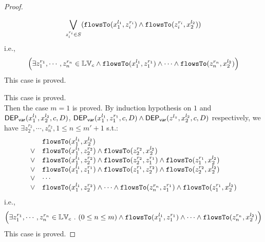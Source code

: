 {\begin{proof}
\begin{subproof}
\begin{enumerate}
\[
\bigvee_{z_i^{r_i} \in S} 
(\mathtt{flowsTo}(x_1^{l_1}, z_i^{r_i}) \land \mathtt{flowsTo}(z_i^{r_i}, x_2^{l_2}))
\]
%
i.e.,
\[
\Big(\exists z_1^{r_1}, \cdots, z_n^{r_n} \in \mathbb{LV}_{{c}}
 \land \mathtt{flowsTo}(x_1^{l_1}, z_1^{r_1}) \land \cdots \land \mathtt{flowsTo}(z_n^{r_n}, {x}_2^{l_2}) \Big)
\]
%
This case is proved.
\end{enumerate}
\end{subproof}
%
This case is proved.
%
\\
Then the case $m = 1$ is proved.
%
By induction hypothesis on $1$ and $\mathsf{DEP_{var}}(x_1^{l_1}, x_2^{l_2}, c, D)$, 
$\mathsf{DEP_{var}}(x_1^{l_1}, z_1^{r_1}, c, D) \land \mathsf{DEP_{var}}(z^{l_z}, x_2^{l_2}, c, D)$ respectively, 
we have $\exists z_2^{r_2}, \cdots, z_n^{r_2}, 1 \leq n \leq m'+1$ s.t.:
\[
\begin{array}{ll}
      & \mathtt{flowsTo}(x_1^{l_1}, x_2^{l_2}) \\
  \lor  & \mathtt{flowsTo}(x_1^{l_1}, z_2^{r_2}) \land \mathtt{flowsTo}(z_2^{r_2}, x_2^{l_2})\\
  \lor  & \mathtt{flowsTo}(x_1^{l_1}, z_2^{r_2}) \land \mathtt{flowsTo}(z_2^{r_2}, z_1^{r_1}) \land \mathtt{flowsTo}(z_1^{r_1}, x_2^{l_2}) \\
  \lor  & \mathtt{flowsTo}(x_1^{l_1}, z_1^{r_1}) \land \mathtt{flowsTo}(z_1^{r_1}, z_2^{r_2}) \land \mathtt{flowsTo}(z_2^{r_2}, x_2^{l_2}) \\
  \lor  & \cdots \\
  \lor  & \mathtt{flowsTo}(x_1^{l_1}, z_2^{r_2}) \land \cdots \land \mathtt{flowsTo}(z_n^{r_n}, z_1^{r_1}) \land \mathtt{flowsTo}(z_1^{r_1}, x_2^{l_2}) \\
\end{array}
\]
i.e.,
\[
\Big(\exists z_1^{r_1}, \cdots, z_n^{r_n} \in \mathbb{LV}_{{c}} ~.~ (0 \leq n \leq m )
 \land \mathtt{flowsTo}(x_1^{l_1}, z_1^{r_1}) \land \cdots \land \mathtt{flowsTo}(z_n^{r_n}, {x}_2^{l_2}) \Big)
\]
This case is proved.


\end{proof}}
